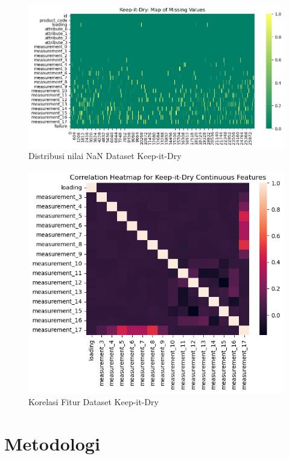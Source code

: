 \documentclass[conference]{IEEEtran}
\begin{document}
\begin{figure}[htbp]
    \centerline{\includegraphics[width=\linewidth, scale=0.5]{KID_Missing_Values.png}}
    \caption{Distribusi nilai NaN Dataset Keep-it-Dry}
    \label{kid_nan}
\end{figure}

\begin{figure}[htbp]
    \centerline{\includegraphics[width=\linewidth, scale=0.5]{KID_Continuous_Features_Correlation_Heatmap.png}}
    \caption{Korelasi Fitur Dataset Keep-it-Dry}
    \label{kid_corr}
\end{figure}

\section{Metodologi}
\end{document}
